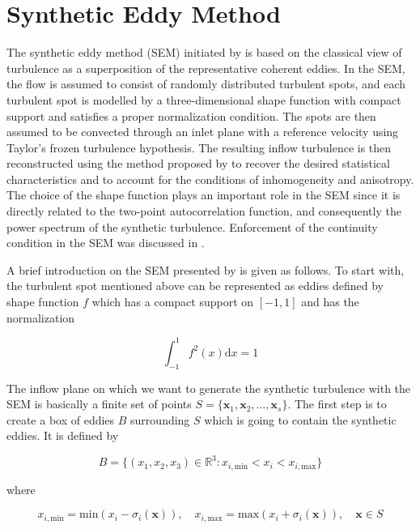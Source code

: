 \section{Synthetic Eddy Method}\label{section3}

The synthetic eddy method (SEM) initiated by \cite{jarrin2006} is based on the classical view of turbulence as a superposition of the representative coherent eddies. In the SEM, the flow is assumed to consist of randomly distributed turbulent spots, and each turbulent spot is modelled by a three-dimensional shape function with compact support and satisfies a proper normalization condition. The spots are then assumed to be convected through an inlet plane with a reference velocity using Taylor's frozen turbulence hypothesis. The resulting inflow turbulence is then reconstructed using the method proposed by to recover the desired statistical characteristics and to account for the conditions of inhomogeneity and anisotropy. The choice of the shape function plays an important role in the SEM since it is directly related to the two-point autocorrelation function, and consequently the power spectrum of the synthetic turbulence. Enforcement of the continuity condition in the SEM was discussed in \cite{poletto2013}.

A brief introduction on the SEM presented by \cite{jarrin2006} is given as follows. To start with, the turbulent spot mentioned above can be represented as eddies defined by shape function $f$ which has a compact support on $[-1,1]$ and has the normalization

\begin{equation} \label{normalization}
\int_{-1}^1 f^2(x) \mathrm{d}x = 1
\end{equation}

\noindent The inflow plane on which we want to generate the synthetic turbulence with the SEM is basically a finite set of points $S = \{\boldsymbol{x}_1,\boldsymbol{x}_2,\ldots,\boldsymbol{x}_s\}$. The first step is to create a box of eddies $B$ surrounding $S$ which is going to contain the synthetic eddies. It is defined by

\begin{equation}
B = \big\{(x_1,x_2,x_3)\in \mathbb{R}^3: x_{i,\text{min}}<x_i<x_{i,\text{max}}\big\}
\end{equation}

\noindent where

\begin{equation}
x_{i,\text{min}} = \text{min}(x_i-\sigma_i(\boldsymbol{x})), \quad x_{i,\text{max}} = \text{max}(x_i+\sigma_i(\boldsymbol{x})), \quad \boldsymbol{x}\in S
\end{equation}

